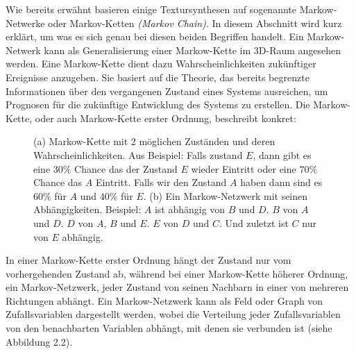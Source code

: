 \documentclass[12pt, a4paper,twoside,openright]{report} %
\begin{document}
Wie bereits erwähnt basieren einige Textursynthesen auf sogenannte Markow-Netwerke oder Markov-Ketten \textit{(Markov Chain)}.
In diesem Abschnitt wird kurz erklärt, um was es sich genau bei diesen beiden Begriffen handelt.
Ein Markow-Netwerk kann als Generalisierung einer Markow-Kette im 3D-Raum angesehen werden.
Eine Markow-Kette dient dazu Wahrscheinlichkeiten zukünftiger Ereignisse anzugeben.
Sie basiert auf die Theorie, das bereits begrenzte Informationen über den vergangenen Zustand eines Systems ausreichen,
um Prognosen für die zukünftige Entwicklung des Systems zu erstellen.
Die Markow-Kette, oder auch Markow-Kette erster Ordnung, beschreibt konkret:
 \cite{wiki:Markow-Kette}

\begin{figure}[H]
    \centering
    \qquad
    \caption{(a) Markow-Kette mit 2 möglichen Zuständen und deren Wahrscheinlichkeiten. Aus \cite{wiki:Markow-Kette}
    Beispiel: Falls zustand $E$, dann gibt es eine $30\%$ Chance das der Zustand $E$ wieder Eintritt oder eine $70\%$ Chance das $A$ Eintritt.
    Falls wir den Zustand $A$ haben dann sind es $60\%$ für $A$ und $40\%$ für $E$. (b) Ein Markow-Netzwerk mit seinen Abhängigkeiten. \cite{wiki:Markov_model}
    Beispiel: $A$ ist abhängig von $B$ und $D$. $B$ von $A$ und $D$. $D$ von $A$, $B$ und $E$. $E$ von $D$ und $C$. Und zuletzt ist $C$ nur von $E$ abhängig.}%
\end{figure}

In einer Markow-Kette erster Ordnung hängt der Zustand nur vom vorhergehenden Zustand ab,
während bei einer Markow-Kette höherer Ordnung, ein Markov-Netzwerk, jeder Zustand von seinen Nachbarn in einer von mehreren Richtungen abhängt. \cite{wiki:Markov_model}
Ein Markow-Netzwerk kann als Feld oder Graph von Zufallsvariablen dargestellt werden,
wobei die Verteilung jeder Zufallsvariablen von den benachbarten Variablen abhängt, mit denen sie verbunden ist {(siehe Abbildung 2.2)}.
\end{document}
